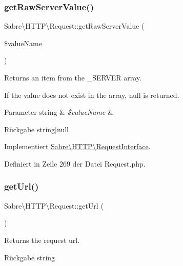 \subsubsection{\texorpdfstring{get\+Raw\+Server\+Value()}{getRawServerValue()}}
{\footnotesize\ttfamily Sabre\textbackslash{}\+H\+T\+T\+P\textbackslash{}\+Request\+::get\+Raw\+Server\+Value (\begin{DoxyParamCaption}\item[{}]{\$value\+Name }\end{DoxyParamCaption})}

Returns an item from the \+\_\+\+S\+E\+R\+V\+ER array.

If the value does not exist in the array, null is returned.


\begin{DoxyParams}[1]{Parameter}
string & {\em \$value\+Name} & \\
\hline
\end{DoxyParams}
\begin{DoxyReturn}{Rückgabe}
string$\vert$null 
\end{DoxyReturn}


Implementiert \mbox{\hyperlink{interface_sabre_1_1_h_t_t_p_1_1_request_interface_a96c2cbeb9c1e9c3431c0f98bc7c7d93c}{Sabre\textbackslash{}\+H\+T\+T\+P\textbackslash{}\+Request\+Interface}}.



Definiert in Zeile 269 der Datei Request.\+php.

\mbox{\label{class_sabre_1_1_h_t_t_p_1_1_request_a197522746cac4ff79480d292b8664f88}} 
\subsubsection{\texorpdfstring{get\+Url()}{getUrl()}}
{\footnotesize\ttfamily Sabre\textbackslash{}\+H\+T\+T\+P\textbackslash{}\+Request\+::get\+Url (\begin{DoxyParamCaption}{ }\end{DoxyParamCaption})}

Returns the request url.

\begin{DoxyReturn}{Rückgabe}
string 
\end{DoxyReturn}


